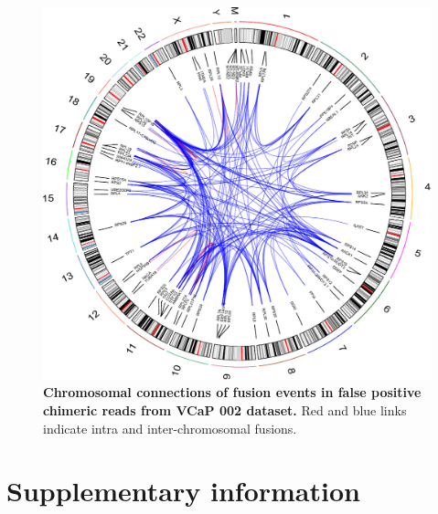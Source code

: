 \documentclass[pdflatex,sn-nature, lineno]{sn-jnl}%
\theoremstyle{thmstyleone}%
\theoremstyle{thmstyletwo}%
\theoremstyle{thmstylethree}%
\begin{document}
\begin{figure}[!h]
	\includegraphics[height=0.97\columnwidth]{finals/sf3}
	\caption{ {\bf Chromosomal connections of fusion events in false positive chimeric reads from VCaP 002 dataset.} Red and blue links indicate intra and inter-chromosomal fusions.}
	\label{fig:sf3}
\end{figure}




\newpage

\section{Supplementary information}
\end{document}
